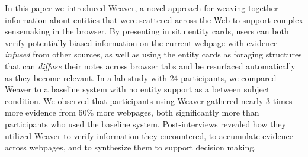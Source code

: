 In this paper we introduced Weaver, a novel approach for weaving together information about entities that were scattered across the Web to support complex sensemaking in the browser. By presenting in situ entity cards, users can both verify potentially biased information on the current webpage with evidence \emph{infused} from other sources, as well as using the entity cards as foraging structures that can \emph{diffuse} their notes across browser tabs and be resurfaced automatically as they become relevant. In a lab study with 24 participants, we compared Weaver to a baseline system with no entity support as a between subject condition. We observed that participants using Weaver gathered nearly 3 times more evidence from 60\% more webpages, both significantly more than participants who used the baseline system. Post-interviews revealed how they utilized Weaver to verify information they encountered, to accumulate evidence across webpages, and to synthesize them to support decision making.



